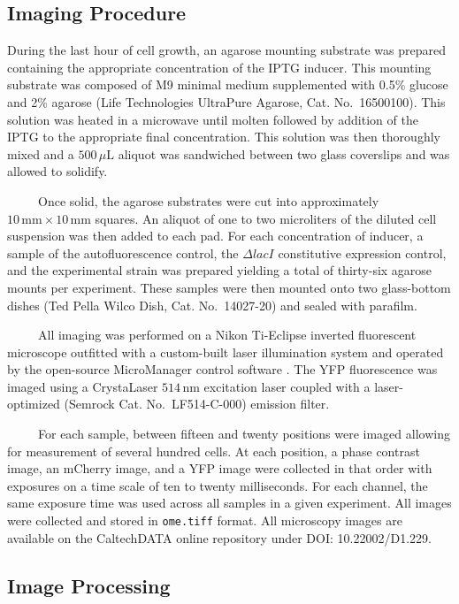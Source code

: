 \documentclass[12pt]{caltech_thesis}
\begin{document}
\hypertarget{imaging-procedure}{%
\subsection{Imaging Procedure}\label{imaging-procedure}}

During the last hour of cell growth, an agarose mounting substrate was
prepared containing the appropriate concentration of the IPTG inducer.
This mounting substrate was composed of M9 minimal medium supplemented
with 0.5\% glucose and 2\% agarose (Life Technologies UltraPure Agarose,
Cat. No.~16500100). This solution was heated in a microwave until molten
followed by addition of the IPTG to the appropriate final concentration.
This solution was then thoroughly mixed and a \(500\,\mu\text{L}\)
aliquot was sandwiched between two glass coverslips and was allowed to
solidify.

~~~~~Once solid, the agarose substrates were cut into approximately
\(10\,\text{mm}\times 10\,\text{mm}\) squares. An aliquot of one to two
microliters of the diluted cell suspension was then added to each pad.
For each concentration of inducer, a sample of the autofluorescence
control, the \(\Delta lacI\) constitutive expression control, and the
experimental strain was prepared yielding a total of thirty-six agarose
mounts per experiment. These samples were then mounted onto two
glass-bottom dishes (Ted Pella Wilco Dish, Cat. No.~14027-20) and sealed
with parafilm.

~~~~~All imaging was performed on a Nikon Ti-Eclipse inverted
fluorescent microscope outfitted with a custom-built laser illumination
system and operated by the open-source MicroManager control software
\autocite{edelstein2014}. The YFP fluorescence was imaged using a
CrystaLaser \(514\,\text{nm}\) excitation laser coupled with a
laser-optimized (Semrock Cat. No.~LF514-C-000) emission filter.

~~~~~For each sample, between fifteen and twenty positions were imaged
allowing for measurement of several hundred cells. At each position, a
phase contrast image, an mCherry image, and a YFP image were collected
in that order with exposures on a time scale of ten to twenty
milliseconds. For each channel, the same exposure time was used across
all samples in a given experiment. All images were collected and stored
in \texttt{ome.tiff} format. All microscopy images are available on the
CaltechDATA online repository under DOI: 10.22002/D1.229.

\hypertarget{image-processing-1}{%
\subsection{Image Processing}\label{image-processing-1}}
\end{document}

